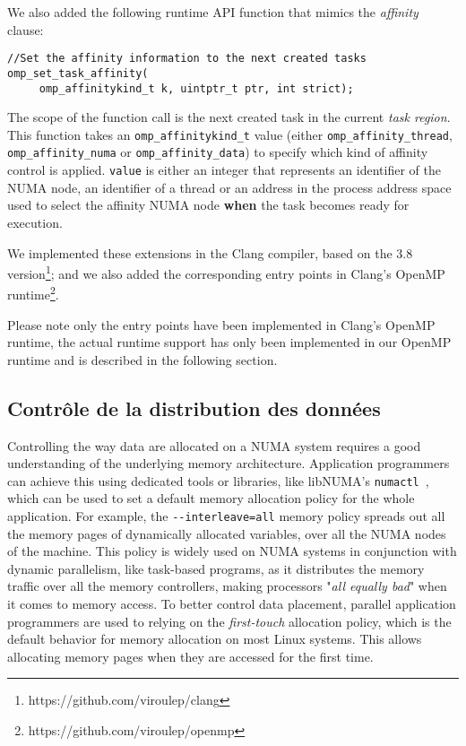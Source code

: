 We also added the following runtime API function that mimics the \textit{affinity} clause:
\begin{lstlisting}
//Set the affinity information to the next created tasks
omp_set_task_affinity( 
     omp_affinitykind_t k, uintptr_t ptr, int strict);
\end{lstlisting}
The scope of the function call is the next created task in the current \textit{task region}.
This function takes an \texttt{omp\_affinitykind\_t} value (either \texttt{omp\_affinity\_thread}, \texttt{omp\_affinity\_numa} or \texttt{omp\_affinity\_data}) to specify which kind of affinity control is applied. \texttt{value} is either an integer that represents an identifier of the NUMA node, an identifier of a thread or an address in the process address space used to select the affinity NUMA node \textbf{when} the task becomes ready for execution.

We implemented these extensions in the Clang compiler, based on the 3.8 version\footnote{https://github.com/viroulep/clang}; and we also added the corresponding entry points in Clang's OpenMP runtime\footnote{https://github.com/viroulep/openmp}.

Please note only the entry points have been implemented in Clang's OpenMP runtime, the actual runtime support has only been implemented in our OpenMP runtime and is described in the following section.

\subsection{Contrôle de la distribution des données}


Controlling the way data are allocated on a NUMA system requires a good understanding of the underlying memory architecture.
Application programmers can achieve this using dedicated tools or libraries, like libNUMA's \verb!numactl!~\cite{DBLP:journals/corr/abs-1101-0093}, which can be used to set a default memory allocation policy for the whole application.
For example, the \verb!--interleave=all! memory policy spreads out all the memory pages of dynamically allocated variables, over all the NUMA nodes of the machine.
This policy is widely used on NUMA systems in conjunction with dynamic parallelism, like task-based programs, as it distributes the memory traffic over all the memory controllers, making processors "\emph{all equally bad}" when it comes to memory access.
To better control data placement, parallel application programmers are used to relying on the \emph{first-touch} allocation policy, which is the default behavior for memory allocation on most Linux systems.
This allows allocating memory pages when they are accessed for the first time.

